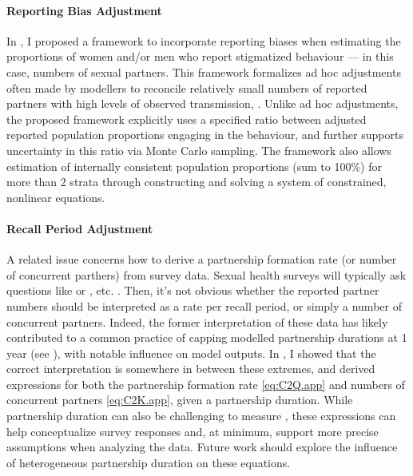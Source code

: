 \paragraph{Reporting Bias Adjustment}
In , I proposed a framework to incorporate reporting biases
when estimating the proportions of women and/or men who report stigmatized behaviour
--- in this case, numbers of sexual partners.
This framework formalizes ad hoc adjustments often made by modellers
to reconcile relatively small numbers of reported partners
with high levels of observed transmission, \eg \cite{Anderson2014}.
Unlike ad hoc adjustments, the proposed framework explicitly uses
a specified ratio between adjusted \vs reported population proportions engaging in the behaviour,
and further supports uncertainty in this ratio via Monte Carlo sampling.
The framework also allows estimation of
internally consistent population proportions (\ie sum to 100\%) for more than 2 strata
through constructing and solving a system of constrained, nonlinear equations.
\paragraph{Recall Period Adjustment}
A related issue concerns how to derive a partnership formation rate
(or number of concurrent parthers) from survey data.
Sexual health surveys will typically ask questions like
 \cite{DHS}
or , etc. \cite{Baral2014,EswKP2014,EswBSS2002}.
Then, it's not obvious whether the reported partner numbers should be interpreted as
a rate per recall period, or simply a number of concurrent partners.
Indeed, the former interpretation of these data has likely contributed to
a common practice of capping modelled partnership durations at 1 year (see ),
with notable influence on model outputs.
In , I showed that the correct interpretation
is somewhere in between these extremes,
and derived expressions for both
the partnership formation rate \eqref{eq:C2Q.app}
and numbers of concurrent partners \eqref{eq:C2K.app}, given a partnership duration.
While partnership duration can also be challenging to measure \cite{Burington2010},
these expressions can help conceptualize survey responses and,
at minimum, support more precise assumptions when analyzing the data.
Future work should explore the influence of heterogeneous partnership duration on these equations.
